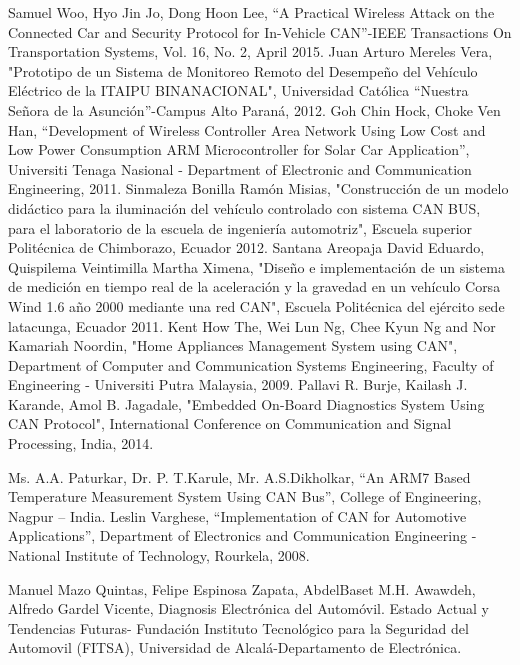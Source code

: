 \begin{thebibliography}{99}
 Samuel Woo, Hyo Jin Jo,  Dong Hoon Lee, “A Practical Wireless Attack on the Connected Car and Security Protocol for In-Vehicle CAN”-IEEE Transactions On Transportation Systems, Vol. 16, No. 2, April 2015.
 Juan Arturo Mereles Vera, "Prototipo de un Sistema de Monitoreo Remoto del Desempeño del Vehículo Eléctrico de la ITAIPU BINANACIONAL", Universidad Católica “Nuestra Señora de la Asunción”-Campus Alto Paraná, 2012. 
 Goh Chin Hock, Choke Ven Han, “Development of Wireless Controller Area Network Using Low Cost and Low Power Consumption ARM Microcontroller for Solar Car Application”, Universiti Tenaga Nasional - Department of Electronic and Communication Engineering, 2011.
 Sinmaleza Bonilla Ramón Misias, "Construcción de un modelo didáctico para la iluminación del vehículo controlado con sistema CAN BUS, para el laboratorio de la escuela de  ingeniería automotriz",  Escuela superior Politécnica de Chimborazo, Ecuador 2012.
Santana Areopaja David Eduardo, Quispilema Veintimilla Martha Ximena, "Diseño e implementación de un sistema de medición en tiempo real de la aceleración y la gravedad en un vehículo Corsa Wind 1.6 año 2000 mediante una red CAN", Escuela Politécnica del ejército sede latacunga, Ecuador 2011.
 Kent How The, Wei Lun Ng, Chee Kyun Ng and Nor Kamariah Noordin, "Home Appliances Management System using CAN", Department of Computer and Communication Systems Engineering, Faculty of Engineering - Universiti Putra Malaysia, 2009.
 Pallavi R. Burje, Kailash J. Karande, Amol B. Jagadale, "Embedded On-Board Diagnostics System Using CAN Protocol", International Conference on Communication and Signal Processing, India, 2014.

 Ms. A.A. Paturkar, Dr. P. T.Karule, Mr. A.S.Dikholkar, “An ARM7 Based Temperature Measurement System Using CAN Bus”, College of Engineering, Nagpur – India.
 Leslin Varghese, “Implementation of CAN for Automotive Applications”, Department of Electronics and Communication Engineering - National Institute of Technology, Rourkela, 2008.


 Manuel Mazo Quintas, Felipe Espinosa Zapata, AbdelBaset M.H. Awawdeh, Alfredo Gardel Vicente, Diagnosis Electrónica del Automóvil. Estado Actual y Tendencias Futuras- Fundación Instituto Tecnológico para la Seguridad del Automovil (FITSA), Universidad de Alcalá-Departamento de Electrónica.


\end{thebibliography}
